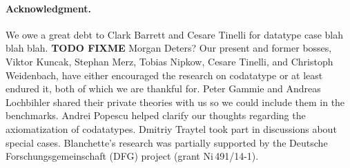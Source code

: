 \def\ackname{Acknowledgment}
\paragraph{\ackname.}
We owe a great debt to Clark Barrett and Cesare Tinelli for datatype case blah
blah blah. \textbf{TODO FIXME}
Morgan Deters?
%
Our present and former bosses, Viktor Kuncak, Stephan Merz, Tobias Nipkow,
Cesare Tinelli, and Christoph Weidenbach, have either encouraged the research on
codatatype or at least endured
it, both of which we are thankful for.
%
Peter Gammie and Andreas Lochbihler shared their private
theories with us so we could include them in the benchmarks.
Andrei Popescu helped clarify our thoughts regarding the axiomatization of
codatatypes. Dmitriy Traytel took part in discussions about special
cases.
%
Blanchette's research was partially supported by the Deutsche
Forschungs\-gemein\-schaft (DFG) project
 (grant Ni\,491\slash 14-1).


{}


